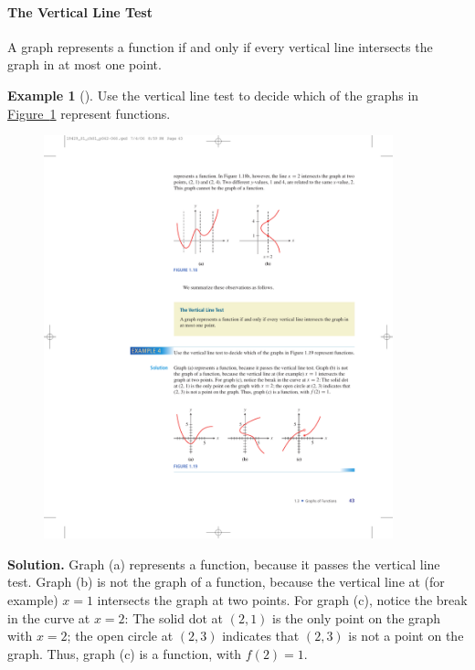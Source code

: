 \documentclass[10pt,]{book}
\theoremstyle{plain}
\theoremstyle{definition}
\theoremstyle{definition}
\theoremstyle{definition}
\newtheorem{example}[theorem]{Example}
\theoremstyle{definition}
\theoremstyle{definition}
\numberwithin{equation}{section}
\begin{document}
\paragraph[The Vertical Line Test]{The Vertical Line Test}\label{paragraphs-9}
A graph represents a function if and only if every vertical line intersects the graph in
at most one point.%
\begin{example}[]\label{example-vertical-line-test}
Use the vertical line test to decide which of the graphs in \hyperref[fig-vertical-line-test2]{Figure~\ref{fig-vertical-line-test2}}  represent functions.%
\leavevmode%
\begin{figure}
\centering
\includegraphics[width=0.90\textwidth,]{images/fig-vertical-line-test2.pdf}\caption{\label{fig-vertical-line-test2}}
\end{figure}
\par\medskip\noindent%
\textbf{Solution.}\quad 
    Graph (a) represents a function, because it passes the vertical line test. Graph (b) is not the graph of a function, because the vertical line at (for example) \(x = 1\) intersects the graph at two points. For graph (c), notice the break in the curve at \(x = 2\): The solid dot at \((2, 1)\) is the only point on the graph with \(x = 2\); the open circle at \((2, 3)\) indicates that \((2, 3)\) is not a point on the graph. Thus, graph (c) is a function, with \(f(2) = 1\).
\end{example}
\end{document}
